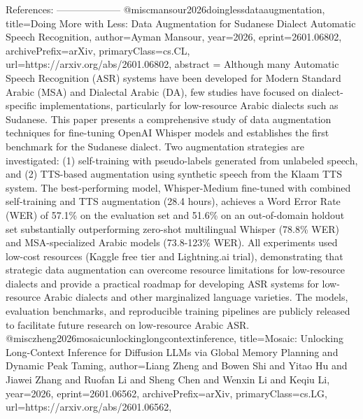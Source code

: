         References:
        --------------------
        @misc{mansour2026doinglessdataaugmentation,
      title={Doing More with Less: Data Augmentation for Sudanese Dialect Automatic Speech Recognition}, 
      author={Ayman Mansour},
      year={2026},
      eprint={2601.06802},
      archivePrefix={arXiv},
      primaryClass={cs.CL},
      url={https://arxiv.org/abs/2601.06802},
      abstract = {Although many Automatic Speech Recognition (ASR) systems have been developed for Modern Standard Arabic (MSA) and Dialectal Arabic (DA), few studies have focused on dialect-specific implementations, particularly for low-resource Arabic dialects such as Sudanese. This paper presents a comprehensive study of data augmentation techniques for fine-tuning OpenAI Whisper models and establishes the first benchmark for the Sudanese dialect. Two augmentation strategies are investigated: (1) self-training with pseudo-labels generated from unlabeled speech, and (2) TTS-based augmentation using synthetic speech from the Klaam TTS system. The best-performing model, Whisper-Medium fine-tuned with combined self-training and TTS augmentation (28.4 hours), achieves a Word Error Rate (WER) of 57.1\% on the evaluation set and 51.6\% on an out-of-domain holdout set substantially outperforming zero-shot multilingual Whisper (78.8\% WER) and MSA-specialized Arabic models (73.8-123\% WER). All experiments used low-cost resources (Kaggle free tier and Lightning.ai trial), demonstrating that strategic data augmentation can overcome resource limitations for low-resource dialects and provide a practical roadmap for developing ASR systems for low-resource Arabic dialects and other marginalized language varieties. The models, evaluation benchmarks, and reproducible training pipelines are publicly released to facilitate future research on low-resource Arabic ASR.}
}@misc{zheng2026mosaicunlockinglongcontextinference,
      title={Mosaic: Unlocking Long-Context Inference for Diffusion LLMs via Global Memory Planning and Dynamic Peak Taming}, 
      author={Liang Zheng and Bowen Shi and Yitao Hu and Jiawei Zhang and Ruofan Li and Sheng Chen and Wenxin Li and Keqiu Li},
      year={2026},
      eprint={2601.06562},
      archivePrefix={arXiv},
      primaryClass={cs.LG},
      url={https://arxiv.org/abs/2601.06562},
}
